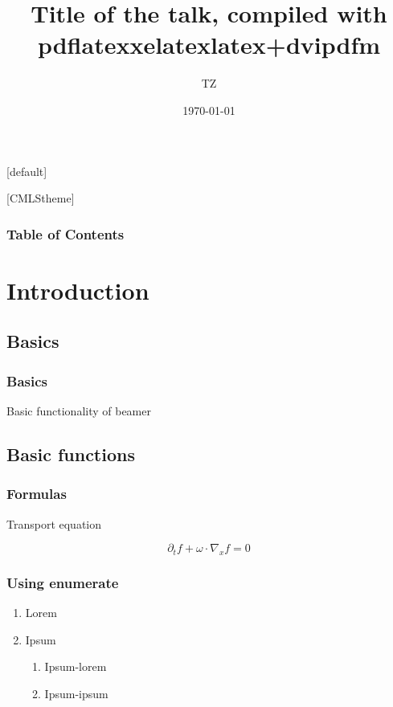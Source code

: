 \documentclass{beamer}
\title{Title of the talk,
compiled with \ifpdf pdflatex\else \ifxetex xelatex\else latex+dvipdfm\fi\fi}
\author{TZ}
\institute{CMLS, l'X
}
\date{\today}
\begin{document}
%
[default]
\begin{frame}
  \titlepage
  \vspace{50pt}
\end{frame}

%
[CMLStheme]
{
\begin{frame}
\frametitle{Table of Contents}
\tableofcontents
\end{frame}
}
\section{Introduction}
\subsection{Basics}
\begin{frame}
	\frametitle{Basics}
Basic functionality of beamer
	
\end{frame}


\subsection{Basic functions}

\begin{frame}
	\frametitle{Formulas}
	Transport equation

	\begin{center}
		 \[\partial_t f+\omega\cdot\nabla_x f =0\]
	\end{center}

\end{frame}

\begin{frame}
\frametitle{Using enumerate}
\begin{enumerate}
\item Lorem 
\item Ipsum
\begin{enumerate}
\item Ipsum-lorem
\item Ipsum-ipsum
\end{enumerate}
\end{enumerate}

\end{frame}
\end{document}
